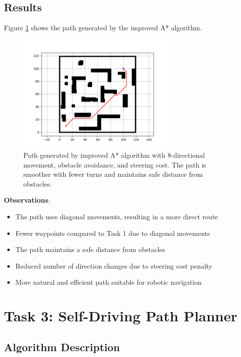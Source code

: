 \documentclass[aps,letterpaper,10pt]{revtex4}
\begin{document}
\subsection{Results}

Figure \ref{fig:task2} shows the path generated by the improved A* algorithm.

\begin{figure}[H]
  \centering
  \includegraphics[width=0.7\textwidth]{assets/task-2.png}
  \caption{Path generated by improved A* algorithm with 8-directional movement, obstacle avoidance, and steering cost. The path is smoother with fewer turns and maintains safe distance from obstacles.}
  \label{fig:task2}
\end{figure}

\textbf{Observations}:
\begin{itemize}
    \item The path uses diagonal movements, resulting in a more direct route
    \item Fewer waypoints compared to Task 1 due to diagonal movements
    \item The path maintains a safe distance from obstacles
    \item Reduced number of direction changes due to steering cost penalty
    \item More natural and efficient path suitable for robotic navigation
\end{itemize}

\newpage
\section{Task 3: Self-Driving Path Planner}

\subsection{Algorithm Description}
\end{document}
